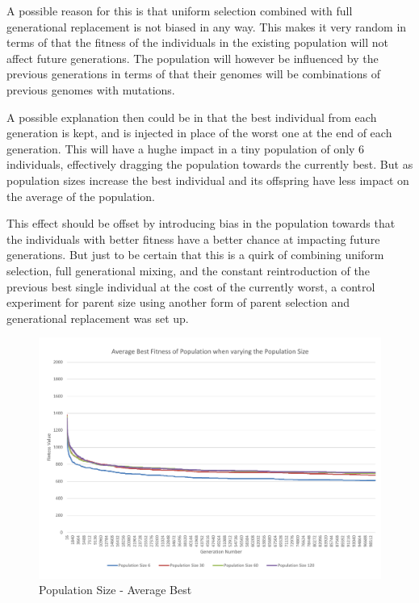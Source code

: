 A possible reason for this is that uniform selection combined with full generational replacement is not biased in any way. This makes it very random in terms of that the fitness of the individuals in the existing population will not affect future generations. The population will however be influenced by the previous generations in terms of that their genomes will be combinations of previous genomes with mutations.

A possible explanation then could be in that the best individual from each generation is kept, and is injected in place of the worst one at the end of each generation. This will have a hughe impact in a tiny population of only 6 individuals, effectively dragging the population towards the currently best. But as population sizes increase the best individual and its offspring have less impact on the average of the population.

This effect should be offset by introducing bias in the population towards that the individuals with better fitness have a better chance at impacting future generations. But just to be certain that this is a quirk of combining uniform selection, full generational mixing, and the constant reintroduction of the previous best single individual at the cost of the currently worst, a control experiment for parent size using another form of parent selection and generational replacement was set up.

\begin{landscape}
\begin{figure}[thbp]
	\centerline{\includegraphics[height=0.945\textwidth]{figures/CircleTests/PopulationSize/CircleTestsPopulationAverageBest.pdf}}
	\caption{Population Size - Average Best}
	\label{fig:ctpab}
\end{figure}
\end{landscape}


